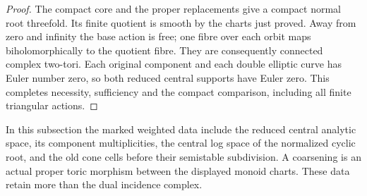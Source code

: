 \begin{proof}
The compact core and the
proper replacements give
a compact normal root
threefold. Its finite
quotient is smooth by the
charts just proved. Away
from zero and infinity
the base action is free;
one fibre over each orbit
maps biholomorphically to
the quotient fibre. They
are consequently connected
complex two-tori. Each
original component and
each double elliptic curve
has Euler number zero,
so both reduced central
supports have Euler zero.
This completes necessity,
sufficiency and the compact
comparison, including all
finite triangular actions.
\end{proof}



In this subsection the marked weighted data include the reduced
central analytic space, its component multiplicities, the central
log space of the normalized cyclic root, and the old cone cells
before their semistable subdivision.  A coarsening is an actual
proper toric morphism between the displayed monoid charts.  These
data retain more than the dual incidence complex.

